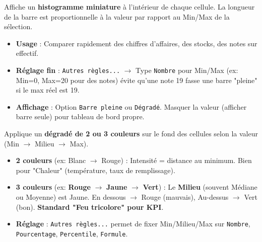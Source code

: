 \documentclass[11pt]{article}
\begin{document}
\begin{propriete}
Affiche un \textbf{histogramme miniature} à l'intérieur de chaque cellule. La longueur de la barre est proportionnelle à la valeur par rapport au Min/Max de la sélection.
\begin{itemize}
    \item \textbf{Usage} : Comparer rapidement des chiffres d'affaires, des stocks, des notes sur effectif.
    \item \textbf{Réglage fin} : \texttt{Autres règles...} $\to$ Type \texttt{Nombre} pour Min/Max (ex: Min=0, Max=20 pour des notes) évite qu'une note 19 fasse une barre "pleine" si le max réel est 19.
    \item \textbf{Affichage} : Option \texttt{Barre pleine} ou \texttt{Dégradé}. Masquer la valeur (afficher barre seule) pour tableau de bord propre.
\end{itemize}
\end{propriete}

\begin{propriete}
Applique un \textbf{dégradé de 2 ou 3 couleurs} sur le fond des cellules selon la valeur (Min $\to$ Milieu $\to$ Max).
\begin{itemize}
    \item \textbf{2 couleurs} (ex: Blanc $\to$ Rouge) : Intensité = distance au minimum. Bien pour "Chaleur" (température, taux de remplissage).
    \item \textbf{3 couleurs} (ex: \textbf{Rouge} $\to$ \textbf{Jaune} $\to$ \textbf{Vert}) : Le \textbf{Milieu} (souvent Médiane ou Moyenne) est Jaune. En dessous $\to$ Rouge (mauvais), Au-dessus $\to$ Vert (bon). \textbf{Standard "Feu tricolore" pour KPI}.
    \item \textbf{Réglage} : \texttt{Autres règles...} permet de fixer Min/Milieu/Max sur \texttt{Nombre}, \texttt{Pourcentage}, \texttt{Percentile}, \texttt{Formule}.
\end{itemize}
\end{propriete}
\end{document}
